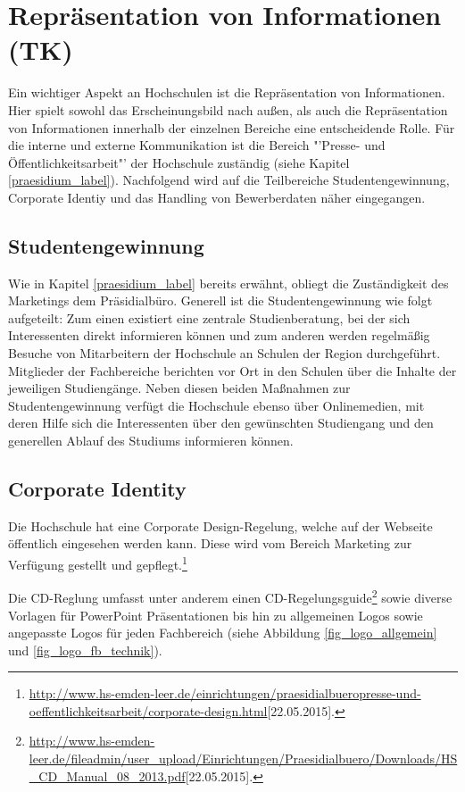 \section{Repräsentation von Informationen (TK)}
Ein wichtiger Aspekt an Hochschulen ist die Repräsentation von Informationen. Hier spielt sowohl das Erscheinungsbild nach außen, als auch die Repräsentation von Informationen innerhalb der einzelnen Bereiche eine entscheidende Rolle. Für die interne und externe Kommunikation ist die Bereich "'Presse- und Öffentlichkeitsarbeit"' der Hochschule zuständig (siehe Kapitel \ref{praesidium_label}). Nachfolgend wird auf die Teilbereiche   Studentengewinnung, Corporate Identiy und das Handling von Bewerberdaten näher eingegangen.

\subsection{Studentengewinnung}
Wie in Kapitel \ref{praesidium_label} bereits erwähnt, obliegt die Zuständigkeit des Marketings dem Präsidialbüro. Generell ist die Studentengewinnung wie folgt aufgeteilt: Zum einen existiert eine zentrale Studienberatung, bei der sich Interessenten direkt informieren können und zum anderen werden regelmäßig Besuche von Mitarbeitern der Hochschule an Schulen der Region durchgeführt. Mitglieder der Fachbereiche berichten vor Ort in den Schulen über die Inhalte der jeweiligen Studiengänge. Neben diesen beiden Maßnahmen zur Studentengewinnung verfügt die Hochschule ebenso über Onlinemedien, mit deren Hilfe sich die Interessenten über den gewünschten Studiengang und den generellen Ablauf des  Studiums informieren können. 


\subsection{Corporate Identity}
Die Hochschule hat eine Corporate Design-Regelung, welche auf der Webseite öffentlich eingesehen werden kann. Diese wird vom Bereich Marketing zur Verfügung gestellt und gepflegt.\footnote{\url{http://www.hs-emden-leer.de/einrichtungen/praesidialbueropresse-und-oeffentlichkeitsarbeit/corporate-design.html}[22.05.2015].}

Die CD-Reglung umfasst unter anderem einen CD-Regelungsguide\footnote{\url{http://www.hs-emden-leer.de/fileadmin/user_upload/Einrichtungen/Praesidialbuero/Downloads/HS_CD_Manual_08_2013.pdf}[22.05.2015].} sowie diverse Vorlagen für PowerPoint Präsentationen bis hin zu allgemeinen Logos sowie angepasste Logos für jeden Fachbereich (siehe Abbildung \ref{fig_logo_allgemein} und \ref{fig_logo_fb_technik}).

